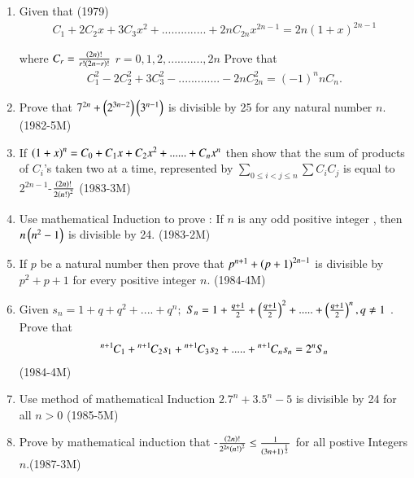 \documentclass[journal,12pt,twocolumn]{IEEEtran}
\theoremstyle{remark}
\begin{document}
    
     \begin{enumerate}
		
          \item Given that  \hfill{(1979)} 
			  \begin{align*}
C_1 + 2C_2x + 3C_3x^2 + .............. + 2nC_{2n}x^{2n-1}   =    2n(1+x)^{2n-1} 
			  \end{align*}
		
		where $C_r =\frac{\left(2n\right)!}{r!\left(2n-r\right)!}$ $r=0,1,2,...........,2n$     Prove that  \begin{align*} 
		     C^2_1-2C_2^2+3C_3^2-.............-2nC_{2n}^2  = (-1)^nnC_n. 
		     \end{align*}  

	   \item Prove that $ 7^{2n} + \left(2^{3n-2}\right)  \left(3^{n-1}\right) $ is divisible by 25 for any natural number $ n$. \hfill{(1982-5M)}  


           \item If $ \left(1+x\right)^n= C_0 + C_1x +C_2x^2+......+C_nx^n $ then show that the sum of products of $ C_i $'s taken
		   two at a time, represented by $ \sum\limits_{0 \leq i<j \leq n}^{}\sum C_i C_j $ is equal to $ 2^{2n-1}$-$\frac{\left(2n\right)!} {2\left(n!\right)^2} $ \hfill{(1983-3M)}

	   \item Use mathematical Induction to prove : If $n$ is any odd positive integer , then  $ n\left(n^2-1\right) $ is divisible by 24.
		   \hfill{(1983-2M)}


	   \item If $ p $ be a natural number then prove that $ p^{n+1}+\left(p+1\right)^{2n-1} $ is divisible by $ p^2+p+1 $ for every positive integer $n$. \hfill{(1984-4M)} 

            \item Given  $ s_n = 1 + q + q^2 +....+q^n;$
		    $ S_n = 1 + \frac{q+1}{2}+\left(\frac{q+1}{2}\right)^2+.....+\left(\frac{q+1}{2}\right)^n,q\neq1 $ . Prove that
		     \begin{align*} 
			    {{}^{n+1}\mkern-1muC_{1}}+{{}^{n+1}\mkern-1muC_{2}}s_1+{{}^{n+1}\mkern-1muC_{3}}s_2+.....+{{}^{n+1}\mkern-1muC_{n}}s_n=2^nS_n
		    \end{align*}    \hfill{(1984-4M)}


	    \item Use method of mathematical Induction  $ 2.7^n +3.5^n-5 $ is divisible by 24 for all $ n>0 $ \hfill{(1985-5M)}


	    \item Prove by mathematical induction that -$\frac{\left(2n\right)!}{2^{2n}\left(n!\right)^2}\leq \frac{1}{\left(3n+1\right)^{\frac{1}{2}}} $ for all postive Integers $n$.\hfill {(1987-3M)}



\end{enumerate}
\end{document}
